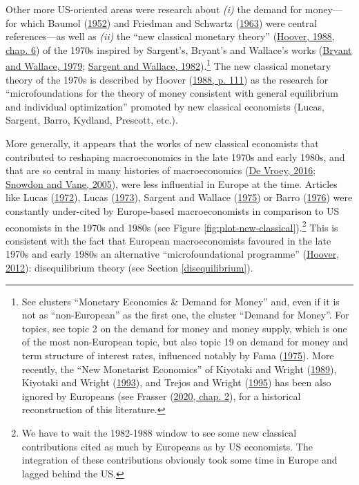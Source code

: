 \documentclass[
  12pt,
  onecolumn]{article}
\begin{document}
Other more US-oriented areas were research about \emph{(i)} the demand
for money---for which Baumol (\protect\hyperlink{ref-baumol1952}{1952})
and Friedman and Schwartz (\protect\hyperlink{ref-friedman1963}{1963})
were central references---as well as \emph{(ii)} the ``new classical
monetary theory'' (\protect\hyperlink{ref-hoover1988}{Hoover, 1988,
chap. 6}) of the 1970s inspired by Sargent's, Bryant's and Wallace's
works (\protect\hyperlink{ref-bryant1979}{Bryant and Wallace, 1979};
\protect\hyperlink{ref-sargent1982}{Sargent and Wallace,
1982}).\footnote{See clusters ``Monetary Economics \& Demand for Money''
  and, even if it is not as ``non-European'' as the first one, the
  cluster ``Demand for Money''. For topics, see topic 2 on the demand
  for money and money supply, which is one of the most non-European
  topic, but also topic 19 on demand for money and term structure of
  interest rates, influenced notably by Fama
  (\protect\hyperlink{ref-fama1975}{1975}). More recently, the ``New
  Monetarist Economics'' of Kiyotaki and Wright
  (\protect\hyperlink{ref-kiyotaki1989}{1989}), Kiyotaki and Wright
  (\protect\hyperlink{ref-kiyotaki1993}{1993}), and Trejos and Wright
  (\protect\hyperlink{ref-trejos1995}{1995}) has been also ignored by
  Europeans (see Frasser (\protect\hyperlink{ref-frasser2020}{2020,
  chap. 2}), for a historical reconstruction of this literature.} The
new classical monetary theory of the 1970s is described by Hoover
(\protect\hyperlink{ref-hoover1988}{1988, p. 111}) as the research for
``microfoundations for the theory of money consistent with general
equilibrium and individual optimization'' promoted by new classical
economists (Lucas, Sargent, Barro, Kydland, Prescott, etc.).

More generally, it appears that the works of new classical economists
that contributed to reshaping macroeconomics in the late 1970s and early
1980s, and that are so central in many histories of macroeconomics
(\protect\hyperlink{ref-devroey2016}{De Vroey, 2016};
\protect\hyperlink{ref-snowdon2005}{Snowdon and Vane, 2005}), were less
influential in Europe at the time. Articles like Lucas
(\protect\hyperlink{ref-lucas1972}{1972}), Lucas
(\protect\hyperlink{ref-lucas1973}{1973}), Sargent and Wallace
(\protect\hyperlink{ref-sargent1975}{1975}) or Barro
(\protect\hyperlink{ref-barro1976}{1976}) were constantly under-cited by
Europe-based macroeconomists in comparison to US economists in the 1970s
and 1980s (see Figure \ref{fig:plot-new-classical}).\footnote{We have to
  wait the 1982-1988 window to see some new classical contributions
  cited as much by Europeans as by US economists. The integration of
  these contributions obviously took some time in Europe and lagged
  behind the US.} This is consistent with the fact that European
macroeconomists favoured in the late 1970s and early 1980s an
alternative ``microfoundational programme''
(\protect\hyperlink{ref-hoover2012}{Hoover, 2012}): disequilibrium
theory (see Section \ref{disequilibrium}).
\end{document}
